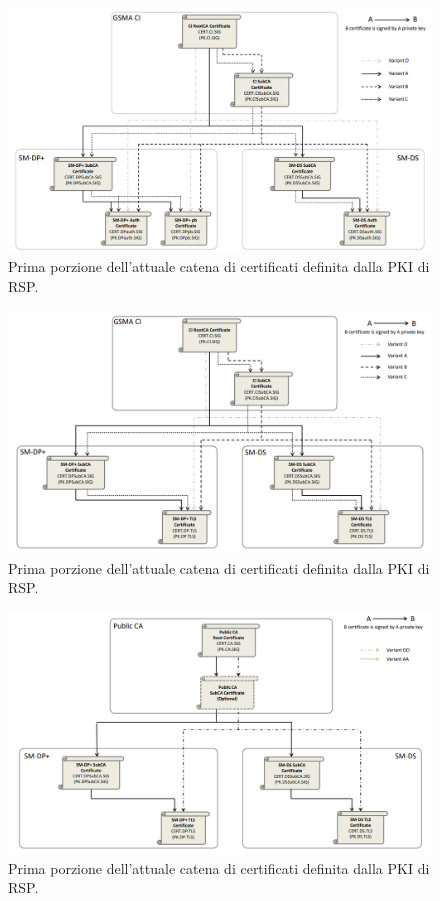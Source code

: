 \documentclass[10pt, twoside, openany]{book}
\begin{document}
\begin{figure}
\includegraphics[width=\linewidth]{cert-chain-new2.png}
\caption{Prima porzione dell'attuale catena di certificati definita dalla PKI di RSP.}
\label{fig:cert-chain-new2}
\end{figure}
\begin{figure}
\includegraphics[width=\linewidth]{cert-chain-new3.png}
\caption{Prima porzione dell'attuale catena di certificati definita dalla PKI di RSP.}
\label{fig:cert-chain-new3}
\end{figure}
\begin{figure}
\includegraphics[width=\linewidth]{cert-chain-new4.png}
\caption{Prima porzione dell'attuale catena di certificati definita dalla PKI di RSP.}
\label{fig:cert-chain-new4}
\end{figure}
\end{document}
